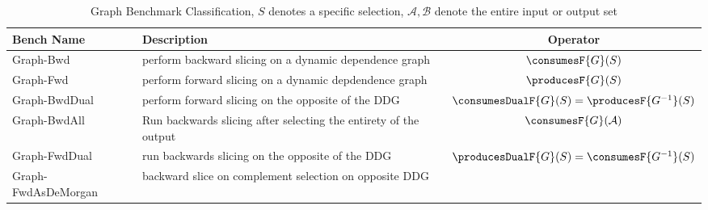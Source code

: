 \begin{table}
\small
\caption{Graph Benchmark Classification, $S$ denotes a specific selection, $\mathcal{A},\mathcal{B}$ denote the entire input or output set}
\label{benchmark-descriptions}
\begin{tabular}{llc}
   \toprule
Bench Name & Description & Operator \\
\midrule
Graph-Bwd & perform backward slicing on a dynamic dependence graph & $\consumesF{G}(S)$ \\ 
Graph-Fwd & perform forward slicing on a dynamic depdendence graph & $\producesF{G}(S)$\\
Graph-BwdDual  & perform forward slicing on the opposite of the DDG & $\consumesDualF{G}(S) = \producesF{G^{-1}}(S)$\\
Graph-BwdAll & Run backwards slicing after selecting the entirety of the output & $\consumesF{G}(\mathcal{A})$\\
Graph-FwdDual & run backwards slicing on the opposite of the DDG & $\producesDualF{G}(S) = \consumesF{G^{-1}}(S)$\\
Graph-FwdAsDeMorgan & backward slice on complement selection on opposite DDG & \\
\bottomrule
\end{tabular}
\end{table}